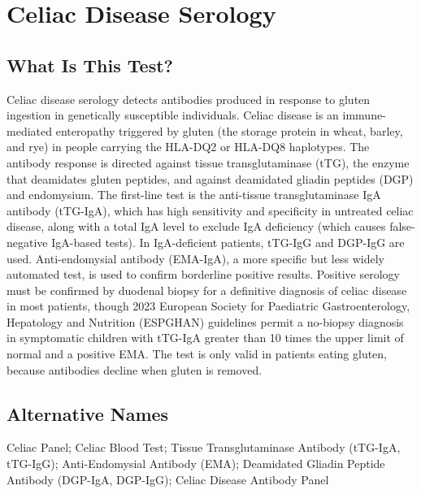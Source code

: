 \chapter{Celiac Disease Serology}

\section*{What Is This Test?}
Celiac disease serology detects antibodies produced in response to gluten ingestion in genetically susceptible individuals. Celiac disease is an immune-mediated enteropathy triggered by gluten (the storage protein in wheat, barley, and rye) in people carrying the HLA-DQ2 or HLA-DQ8 haplotypes. The antibody response is directed against tissue transglutaminase (tTG), the enzyme that deamidates gluten peptides, and against deamidated gliadin peptides (DGP) and endomysium. The first-line test is the anti-tissue transglutaminase IgA antibody (tTG-IgA), which has high sensitivity and specificity in untreated celiac disease, along with a total IgA level to exclude IgA deficiency (which causes false-negative IgA-based tests). In IgA-deficient patients, tTG-IgG and DGP-IgG are used. Anti-endomysial antibody (EMA-IgA), a more specific but less widely automated test, is used to confirm borderline positive results. Positive serology must be confirmed by duodenal biopsy for a definitive diagnosis of celiac disease in most patients, though 2023 European Society for Paediatric Gastroenterology, Hepatology and Nutrition (ESPGHAN) guidelines permit a no-biopsy diagnosis in symptomatic children with tTG-IgA greater than 10 times the upper limit of normal and a positive EMA. The test is only valid in patients eating gluten, because antibodies decline when gluten is removed.

\section*{Alternative Names}
Celiac Panel; Celiac Blood Test; Tissue Transglutaminase Antibody (tTG-IgA, tTG-IgG); Anti-Endomysial Antibody (EMA); Deamidated Gliadin Peptide Antibody (DGP-IgA, DGP-IgG); Celiac Disease Antibody Panel

